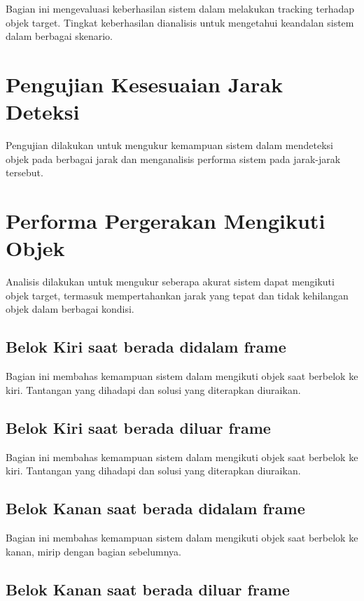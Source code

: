 Bagian ini mengevaluasi keberhasilan sistem dalam melakukan tracking terhadap objek target. Tingkat keberhasilan dianalisis untuk mengetahui keandalan sistem dalam berbagai skenario.

\section{Pengujian Kesesuaian Jarak Deteksi}
\label{sec:pengujiankesesuaianjarakdeteksi}

Pengujian dilakukan untuk mengukur kemampuan sistem dalam mendeteksi objek pada berbagai jarak  dan menganalisis performa sistem pada jarak-jarak tersebut.

\section{Performa Pergerakan Mengikuti Objek}
\label{sec:performaakurasiobjek}

Analisis dilakukan untuk mengukur seberapa akurat sistem dapat mengikuti objek target, termasuk mempertahankan jarak yang tepat dan tidak kehilangan objek dalam berbagai kondisi.

\subsection{Belok Kiri saat berada didalam frame}
\label{subsec:belokkiridalamframe}

Bagian ini membahas kemampuan sistem dalam mengikuti objek saat berbelok ke kiri. Tantangan yang dihadapi dan solusi yang diterapkan diuraikan.

\subsection{Belok Kiri saat berada diluar frame}
\label{subsec:belokkiriluarframe}

Bagian ini membahas kemampuan sistem dalam mengikuti objek saat berbelok ke kiri. Tantangan yang dihadapi dan solusi yang diterapkan diuraikan.

\subsection{Belok Kanan saat berada didalam frame}
\label{subsec:belokkanandalamframe}

Bagian ini membahas kemampuan sistem dalam mengikuti objek saat berbelok ke kanan, mirip dengan bagian sebelumnya.

\subsection{Belok Kanan saat berada diluar frame}
\label{subsec:belokkananluarframe}

